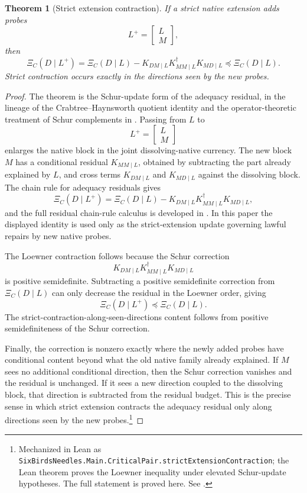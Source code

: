 \documentclass[11pt]{article}
\newcommand{\XiRes}{\Xi}
\newcommand{\preceqq}{\preceq}
\newtheorem{theorem}{Theorem}[section]
\theoremstyle{definition}
\begin{document}
\begin{theorem}[Strict extension contraction]\label{thm:main:strict-extension-contraction}
If a strict native extension adds probes
\[
  L^+=\begin{bmatrix}L\\M\end{bmatrix},
\]
then
\[
  \XiRes_C(D\mid L^+)
  =
  \XiRes_C(D\mid L)
  -K_{DM\mid L}K_{MM\mid L}^\dagger K_{MD\mid L}
  \preceqq \XiRes_C(D\mid L).
\]
Strict contraction occurs exactly in the directions seen by the new probes.
\end{theorem}

\begin{proof}
The theorem is the Schur-update form of the adequacy residual,
in the lineage of the Crabtree--Haynsworth quotient identity
\citep{CrabtreeHaynsworth1969Quotient} and the operator-theoretic
treatment of Schur complements in \citep{Ando2005SchurOperator}.  Passing
from \(L\) to
\[
  L^+=\begin{bmatrix}L\\M\end{bmatrix}
\]
enlarges the native block in the joint dissolving-native currency.  The
new block \(M\) has a conditional residual \(K_{MM\mid L}\), obtained by
subtracting the part already explained by \(L\), and cross terms
\(K_{DM\mid L}\) and \(K_{MD\mid L}\) against the dissolving block.  The
chain rule for adequacy residuals gives
\[
  \XiRes_C(D\mid L^+)
  =
  \XiRes_C(D\mid L)
  -K_{DM\mid L}K_{MM\mid L}^\dagger K_{MD\mid L},
\]
and the full residual chain-rule calculus is developed in
\citet{Tsiokos2026XiCompanion}.  In this paper the displayed identity is
used only as the strict-extension update governing lawful repairs by
new native probes.

The Loewner contraction follows because the Schur correction
\[
  K_{DM\mid L}K_{MM\mid L}^\dagger K_{MD\mid L}
\]
is positive semidefinite.  Subtracting a positive semidefinite
correction from \(\XiRes_C(D\mid L)\) can only decrease the residual in
the Loewner order, giving
\[
  \XiRes_C(D\mid L^+)\preceqq\XiRes_C(D\mid L).
\]
The strict-contraction-along-seen-directions content follows from
positive semidefiniteness of the Schur correction.

Finally, the correction is nonzero exactly where the newly added probes
have conditional content beyond what the old native family already
explained.  If \(M\) sees no additional conditional direction, then the
Schur correction vanishes and the residual is unchanged.  If it sees a
new direction coupled to the dissolving block, that direction is
subtracted from the residual budget.  This is the precise sense in
which strict extension contracts the adequacy residual only along
directions seen by the new probes.\footnote{Mechanized in Lean as
\texttt{SixBirdsNeedles.Main.CriticalPair.strictExtensionContraction};
the Lean theorem proves the Loewner inequality under elevated
Schur-update hypotheses.  The full statement is proved here.  See
.}
\end{proof}
\end{document}
